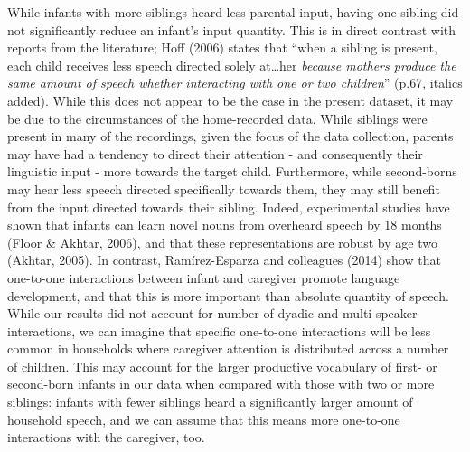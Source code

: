 \documentclass[
  english,
  man,floatsintext]{apa6}
\begin{document}
While infants with more siblings heard less parental input, having one sibling did not significantly reduce an infant's input quantity. This is in direct contrast with reports from the literature; Hoff (2006) states that \enquote{when a sibling is present, each child receives less speech directed solely at\ldots her \emph{because mothers produce the same amount of speech whether interacting with one or two children}} (p.67, italics added). While this does not appear to be the case in the present dataset, it may be due to the circumstances of the home-recorded data. While siblings were present in many of the recordings, given the focus of the data collection, parents may have had a tendency to direct their attention - and consequently their linguistic input - more towards the target child. Furthermore, while second-borns may hear less speech directed specifically towards them, they may still benefit from the input directed towards their sibling. Indeed, experimental studies have shown that infants can learn novel nouns from overheard speech by 18 months (Floor \& Akhtar, 2006), and that these representations are robust by age two (Akhtar, 2005). In contrast, Ramírez-Esparza and colleagues (2014) show that one-to-one interactions between infant and caregiver promote language development, and that this is more important than absolute quantity of speech. While our results did not account for number of dyadic and multi-speaker interactions, we can imagine that specific one-to-one interactions will be less common in households where caregiver attention is distributed across a number of children. This may account for the larger productive vocabulary of first- or second-born infants in our data when compared with those with two or more siblings: infants with fewer siblings heard a significantly larger amount of household speech, and we can assume that this means more one-to-one interactions with the caregiver, too.
\end{document}
